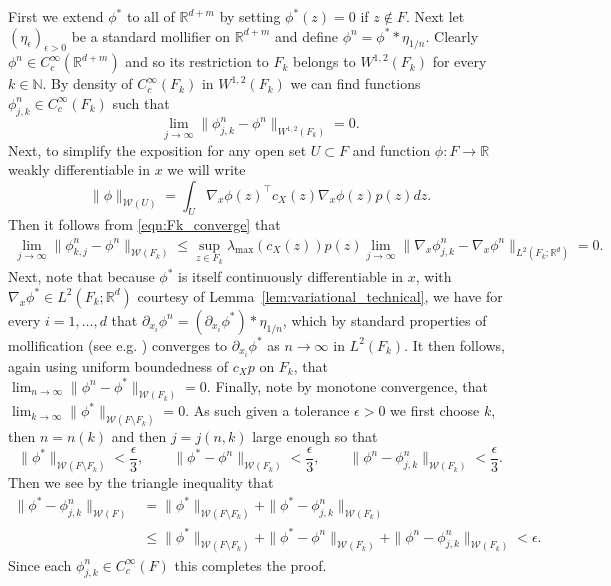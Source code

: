 \documentclass{article}
\makeatletter
\theoremstyle{plain}
\theoremstyle{definition}
\newcommand{\R}{\mathbb{R}}
\newcommand{\N}{\mathbb{N}}
\newcommand{\Wcal}{{\mathcal W}}
\numberwithin{lem}{section}
\renewenvironment{proof}[1][\proofname] {\par\pushQED{\qed}\normalfont\topsep6\p@\@plus6\p@\relax\trivlist\item[\hskip\labelsep\bfseries#1\@addpunct{.}]\ignorespaces}{\popQED\endtrivlist\@endpefalse}
\makeatother
\begin{document}
\begin{proof}
First we extend $\phi^*$ to all of $\R^{d+m}$ by setting $\phi^*(z) = 0$ if $z \not \in F$. Next let $(\eta_\epsilon)_{\epsilon > 0}$ be a standard mollifier on $\R^{d+m}$ and define $\phi^n = \phi^**\eta_{1/n}$. Clearly $\phi^n \in C_c^\infty(\R^{d+m})$ and so its restriction to $F_k$ belongs to $W^{1,2}(F_k)$ for every $k \in \N$. By density of $C_c^\infty(F_k)$ in $W^{1,2}(F_k)$ we can find functions $\phi^n_{j,k} \in C_c^\infty(F_k)$ such that
\begin{equation}
    \label{eqn:Fk_converge}
    \lim_{j \to \infty} \|\phi^n_{j,k} - \phi^n\|_{W^{1,2}(F_k)} = 0.
\end{equation}
Next, to simplify the exposition for any open set $U \subset F$ and function $\phi: F \to \R$ weakly differentiable in $x$ we will write
\[\|\phi\|_{\Wcal(U)} = \int_U \nabla_x \phi(z)^\top c_X(z)\nabla_x\phi(z)p(z)dz.\] Then it follows from \eqref{eqn:Fk_converge} that
\begin{align} 
\lim_{j \to \infty} \|\phi^n_{k,j} - \phi^n\|_{\Wcal(F_k)} \leq \sup_{z \in F_k}\lambda_{\max}(c_X(z))p(z)\lim_{j \to \infty}\|\nabla_x\phi^n_{j,k}-\nabla_x\phi^n\|_{L^2(F_k;\R^d)} = 0.
\end{align}  Next, note that because $\phi^*$ is itself continuously differentiable in $x$, with $\nabla_x\phi^* \in L^2(F_k;\R^d)$ courtesy of Lemma~\ref{lem:variational_technical}, we have for every $i=1,\dots,d$ that $\partial_{x_i} \phi^n = (\partial_{x_i}\phi^*)* \eta_{1/n}$, which by standard properties of mollification (see e.g. \cite[Theorem~~C.5.7]{evanspartial2010}) converges to $\partial_{x_i}\phi^*$ as $n \to \infty$ in $L^2(F_k)$. It then follows, again using uniform boundedness of $c_Xp$ on $F_k$, that
$\lim_{n \to \infty}\|\phi^n - \phi^*\|_{\Wcal(F_k)} = 0.$
Finally, note by monotone convergence, that $\lim_{k \to \infty} \|\phi^*\|_{\Wcal(F\setminus F_k)} = 0$. As such given a tolerance $\epsilon > 0$ we first choose $k$, then $n = n(k)$ and then $j = j(n,k)$ large enough so that
\[\|\phi^*\|_{\Wcal(F\setminus F_k)} < \frac{\epsilon}{3}, \qquad \|\phi^* - \phi^n\|_{\Wcal(F_k)} < \frac{\epsilon}{3}, \qquad \|\phi^n - \phi^n_{j,k}\|_{\Wcal(F_k)} < \frac{\epsilon}{3}.\]
Then we see by the triangle inequality that
\begin{align}
\|\phi^* - \phi^n_{j,k}\|_{\Wcal(F)} & = \|\phi^*\|_{\Wcal(F\setminus F_k)} + \|\phi^* - \phi^n_{j,k}\|_{\Wcal(F_k)} \\
& \leq \|\phi^*\|_{\Wcal(F\setminus F_k)} + \|\phi^* - \phi^n\|_{\Wcal(F_k)} + \|\phi^n -  \phi^n_{j,k}\|_{\Wcal(F_k)} < \epsilon.
\end{align}
Since each $\phi^n_{j,k} \in C_c^\infty(F)$ this completes the proof.
\end{proof}
\end{document}
